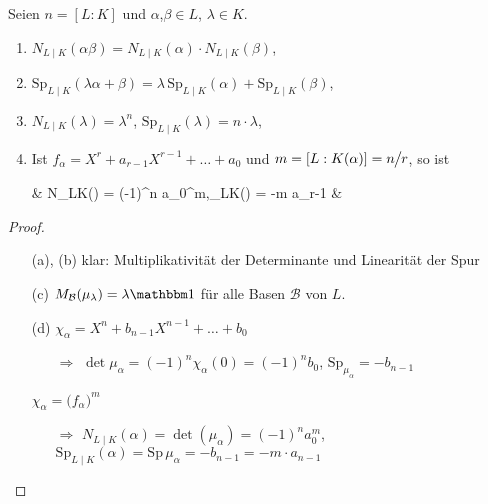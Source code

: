 \begin{lemma}
	Seien $n = [L:K]$ und $\alpha$,$\beta\in L$, $\lambda\in K$.
	\begin{enumerate}[label={(\alph*)}]
		\item $N_{L\mid K}(\alpha\beta) = N_{L\mid K}(\alpha)\cdot N_{L\mid K}(\beta)$,
		\item $\mathrm{Sp}_{L\mid K}(\lambda\alpha + \beta) = \lambda\,\mathrm{Sp}_{L\mid K}(\alpha) + \mathrm{Sp}_{L\mid K}(\beta)$,
		\item $N_{L\mid K}(\lambda) = \lambda^n$, $\mathrm{Sp}_{L\mid K}(\lambda) = n\cdot\lambda$,
		\item Ist $f_\alpha = X^r + a_{r-1} X^{r-1} + \dots + a_0$ und $m = [L:K(\alpha)] = n\mskip-1mu\big\slash \mskip-1mu r$, so ist \begin{flalign*}
			\quad & N_{L\mid K}(\alpha) = (-1)^n a_0^m,\quad{}_{L\mid K}(\alpha) = -m a_{r-1} &
		\end{flalign*}
	\end{enumerate}
\end{lemma}
\begin{proof}\leavevmode
	\begin{itemize}[topsep=-6pt,widest={(a), (b)},leftmargin=*]
		\item[(a), (b)] klar: Multiplikativität der Determinante und Linearität der Spur
		\item[(c)] $M_{\mathcal B}(\mu_\lambda) = \lambda\mathbbm 1$ für alle Basen $\mathcal B$ von $L$.
		\item[(d)] $\chi_\alpha = X^n + b_{n-1} X^{n-1} + \dots + b_0$ \begin{itemize}[topsep=-6pt]
			\item[$\Rightarrow$] $\det\mu_\alpha = (-1)^n \chi_\alpha(0) = (-1)^n b_0$, $\mathrm{Sp}_{\mu_\alpha} = - b_{n-1}$
		\end{itemize}
		\vspace*{4\lineskip}
		$\chi_\alpha = \big(f_{\alpha}\big)^m$
		\begin{itemize}[topsep=-6pt]
			\item[$\Rightarrow$] $N_{L\mid K}(\alpha) = \det(\mu_\alpha) = (-1)^n a_0^m$, $\mathrm{Sp}_{L\mid K}(\alpha) = \mathrm{Sp}\,\mu_\alpha = -b_{n-1} = -m \cdot a_{n-1}$
		\end{itemize}
	\end{itemize}
\end{proof}

